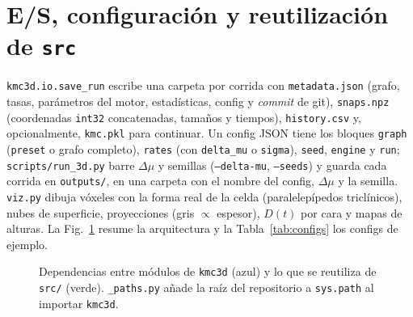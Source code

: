 \documentclass[11pt,a4paper]{article}
\newcommand{\code}[1]{\texttt{#1}}
\newcommand{\dmu}{\Delta\mu}
\begin{document}
\section{E/S, configuración y reutilización de \texttt{src}}
\label{sec:io}

\code{kmc3d.io.save\_run} escribe una carpeta por corrida con \code{metadata.json} (grafo, tasas,
parámetros del motor, estadísticas, config y \emph{commit} de git), \code{snaps.npz} (coordenadas
\code{int32} concatenadas, tamaños y tiempos), \code{history.csv} y, opcionalmente, \code{kmc.pkl}
para continuar. Un config JSON tiene los bloques \code{graph} (\code{preset} o grafo completo),
\code{rates} (con \code{delta\_mu} o \code{sigma}), \code{seed}, \code{engine} y \code{run};
\code{scripts/run\_3d.py} barre $\dmu$ y semillas (\code{--delta-mu}, \code{--seeds}) y guarda cada
corrida en \code{outputs/}, en una carpeta con el nombre del config, $\dmu$ y la semilla. \code{viz.py} dibuja vóxeles con la forma real de la
celda (paralelepípedos triclínicos), nubes de superficie, proyecciones (gris $\propto$ espesor),
$D(t)$ por cara y mapas de alturas. La Fig.~\ref{fig:arq} resume la arquitectura y la
Tabla~\ref{tab:configs} los configs de ejemplo.

\begin{figure}[t]
\centering
{}
\caption{Dependencias entre módulos de \code{kmc3d} (azul) y lo que se reutiliza de \code{src/}
(verde). \code{\_paths.py} añade la raíz del repositorio a \code{sys.path} al importar \code{kmc3d}.}
\label{fig:arq}
\end{figure}
\end{document}
